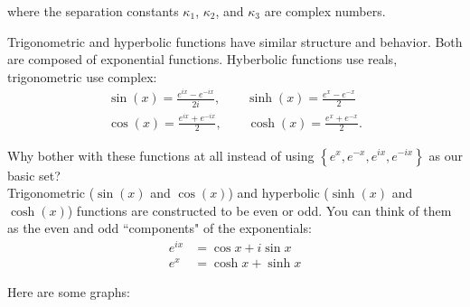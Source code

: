 \documentclass{article}
\numberwithin{equation}{section}
\begin{document}
where the separation constants $\kappa_1$, $\kappa_2$, and $\kappa_3$ are complex numbers.

\begin{mdframed}[backgroundcolor=white, align=left, userdefinedwidth=\textwidth, topline=false, bottomline = false, rightline = false, frametitle = {An interlude: Trigonometric and Hyperbolic Functions.}]

Trigonometric and hyperbolic functions have similar structure and behavior. Both are composed of exponential functions. Hyberbolic functions use reals, trigonometric use complex:
\begin{gather*}
    \sin{(x)} = \frac{e^{ix} - e^{-ix}}{2i}, \qquad \sinh{(x)} = \frac{e^x - e^{-x}}{2} \\
    \cos{(x)} = \frac{e^{ix} + e^{-ix}}{2}, \qquad \cosh{(x)} = \frac{e^x + e^{-x}}{2}.
\end{gather*}

Why bother with these functions at all instead of using $\left\{ e^x, e^{-x}, e^{ix}, e^{-ix} \right\}$ as our basic set? \\

Trigonometric ($\sin{(x)}$ and $\cos{(x)}$) and hyperbolic ($\sinh{(x)}$ and $\cosh{(x)}$) functions are constructed to be even or odd. You can think of them as the even and odd ``components" of the exponentials:
\begin{align*}
    e^{ix} &= \cos{x} + i \sin{x} \\
    e^x &= \cosh{x} + \sinh{x}
\end{align*}

Here are some graphs:

\begin{minipage}{0.5\textwidth}
\begin{flushleft}
\end{flushleft}
\end{minipage}
~
\begin{minipage}{0.5\textwidth}
\begin{flushright}
\end{flushright}
\end{minipage}


\end{mdframed}
\end{document}
